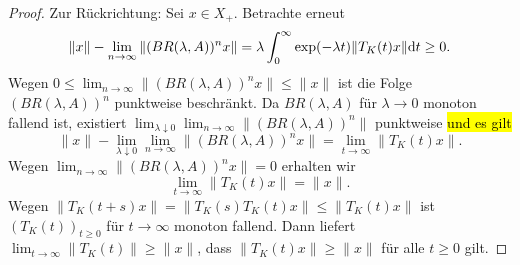 \begin{proof}
\par
Zur  Rückrichtung: Sei $x\in X_+$. Betrachte erneut
\begin{equation*}
\|x\| - \lim_{n\to\infty}\|(BR(\lambda, A))^n x\| = \lambda\int_0^\infty \exp(-\lambda t)\|T_K(t)x\|\textnormal dt\geq0.
\end{equation*} 
Wegen $0\leq \lim_{n\to\infty}\|(BR(\lambda, A))^n x\|\leq \|x\|$ ist die Folge $(BR(\lambda, A))^n$  punktweise beschränkt. Da $BR(\lambda, A)$ für  $\lambda\to 0$ monoton fallend ist, existiert $\lim_{\lambda\downarrow 0} \lim_{n\to\infty}\|(BR(\lambda, A))^n\|$ punktweise \hl{und es gilt}
\begin{equation*}
\|x\| - \lim_{\lambda\downarrow0}\lim_{n\to\infty}\|(BR(\lambda, A))^n x\|=\lim_{t\to\infty} \|T_K(t)x\|.
\end{equation*}
Wegen $\lim_{n\to\infty}\|(BR(\lambda, A))^n x\| =0$ erhalten wir 
\begin{equation*}
\lim_{t\to\infty} \|T_K(t)x\| = \|x\|.
\end{equation*}
Wegen $\|T_K(t+s)x\|=\|T_K(s)T_K(t)x\|\leq \|T_K(t)x\|$ ist $(T_K(t))_{t\geq0}$ für $t\to\infty$ monoton fallend. Dann liefert $\lim_{t\to\infty}\|T_K(t)\|\geq \|x\|$, dass $\|T_K(t)x\|\geq\|x\|$ für alle $t\geq0$ gilt. 
\par






\par 

\end{proof}

